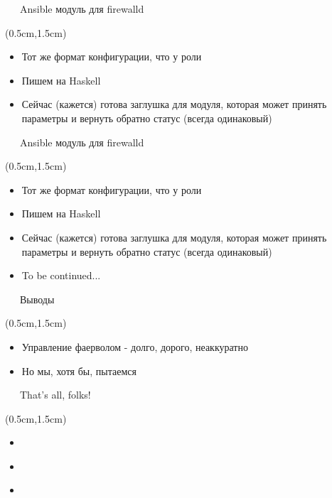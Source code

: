 \documentclass[xetex,18pt,aspectratio=43]{beamer}
\begin{document}
\begin{Large}
\begin{frame}{\ \ \ Ansible модуль для firewalld}
\begin{textblock*}{\framewidth-0.8cm}(0.5cm,1.5cm)
\begin{itemize}
  \item Тот же формат конфигурации, что у роли
  \item Пишем на Haskell
  \item Сейчас (кажется) готова заглушка для модуля, которая может принять параметры и
    вернуть обратно статус (всегда одинаковый)
\end{itemize}
\end{textblock*}
\end{frame}

\begin{frame}{\ \ \ Ansible модуль для firewalld}
\begin{textblock*}{\framewidth-0.8cm}(0.5cm,1.5cm)
\begin{itemize}
  \item Тот же формат конфигурации, что у роли
  \item Пишем на Haskell
  \item Сейчас (кажется) готова заглушка для модуля, которая может принять параметры и
    вернуть обратно статус (всегда одинаковый)
  \item To be continued...
\end{itemize}
\end{textblock*}
\end{frame}

\begin{frame}{\ \ \ Выводы}
\begin{textblock*}{\framewidth-0.8cm}(0.5cm,1.5cm)
\begin{itemize}
  \item Управление фаерволом - долго, дорого, неаккуратно
  \item Но мы, хотя бы, пытаемся
\end{itemize}
\end{textblock*}
\end{frame}

\begin{frame}{\ \ \ That's all, folks!}
\begin{textblock*}{\framewidth-0.8cm}(0.5cm,1.5cm)
\begin{itemize}
  \item \href{mailto:alexclear@gmail.com}{\color{blue}{alexclear@gmail.com}}
  \item \href{https://telegram.me/lhommequipleure}{\color{blue}{https://telegram.me/lhommequipleure}}
  \item \href{https://telegram.me/demeliorator\_pod}{\color{blue}{https://telegram.me/demeliorator\_pod}}
\end{itemize}
\end{textblock*}
\end{frame}

\end{Large}
\end{document}
